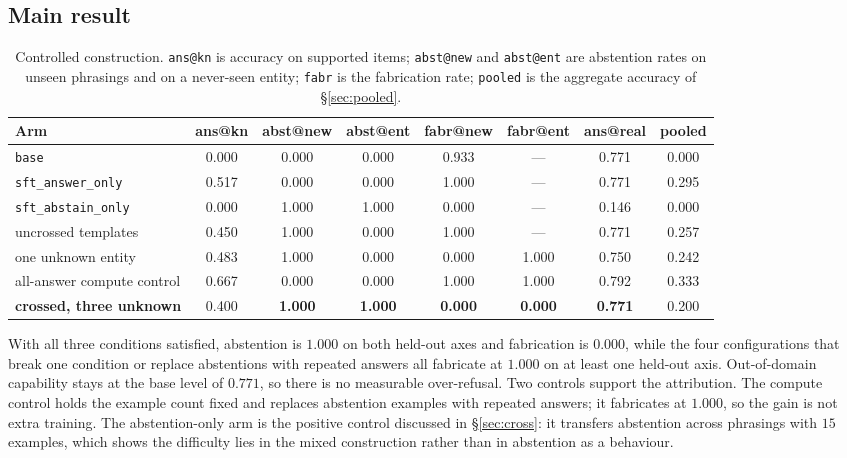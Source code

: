 \documentclass[11pt,a4paper]{article}
\newcommand{\good}[1]{\textcolor{green!45!black}{\textbf{#1}}}
\begin{document}
\subsection{Main result}

\begin{table}[t]\centering\small
\caption{Controlled construction. \texttt{ans@kn} is accuracy on supported
items; \texttt{abst@new} and \texttt{abst@ent} are abstention rates on unseen
phrasings and on a never-seen entity; \texttt{fabr} is the fabrication rate;
\texttt{pooled} is the aggregate accuracy of \S\ref{sec:pooled}.}
\label{tab:main}
\begin{adjustbox}{max width=\linewidth}
\begin{tabular}{@{}lccccccc@{}}
\toprule
Arm & ans@kn & abst@new & abst@ent & fabr@new & fabr@ent & ans@real & pooled \\
\midrule
\texttt{base} & 0.000 & 0.000 & 0.000 & 0.933 & --- & 0.771 & 0.000 \\
\texttt{sft\_answer\_only} & 0.517 & 0.000 & 0.000 & 1.000 & --- & 0.771 & 0.295 \\
\texttt{sft\_abstain\_only} & 0.000 & 1.000 & 1.000 & 0.000 & --- & 0.146 & 0.000 \\
\midrule
uncrossed templates & 0.450 & 1.000 & 0.000 & 1.000 & --- & 0.771 & 0.257 \\
one unknown entity & 0.483 & 1.000 & 0.000 & 0.000 & 1.000 & 0.750 & 0.242 \\
all-answer compute control & 0.667 & 0.000 & 0.000 & 1.000 & 1.000 & 0.792 & 0.333 \\
\midrule
\textbf{crossed, three unknown} & 0.400 & \good{1.000} & \good{1.000} &
\good{0.000} & \good{0.000} & \good{0.771} & 0.200 \\
\bottomrule
\end{tabular}
\end{adjustbox}
\end{table}

With all three conditions satisfied, abstention is $1.000$ on both held-out
axes and fabrication is $0.000$, while the four configurations that break one
condition or replace abstentions with repeated answers all fabricate at
$1.000$ on at least one held-out axis. Out-of-domain capability stays at the
base level of $0.771$, so there is no measurable over-refusal. Two controls
support the attribution. The compute control holds the example count fixed and
replaces abstention examples with repeated answers; it fabricates at $1.000$,
so the gain is not extra training. The abstention-only arm is the positive
control discussed in \S\ref{sec:cross}: it transfers abstention across
phrasings with $15$ examples, which shows the difficulty lies in the mixed
construction rather than in abstention as a behaviour.
\end{document}
